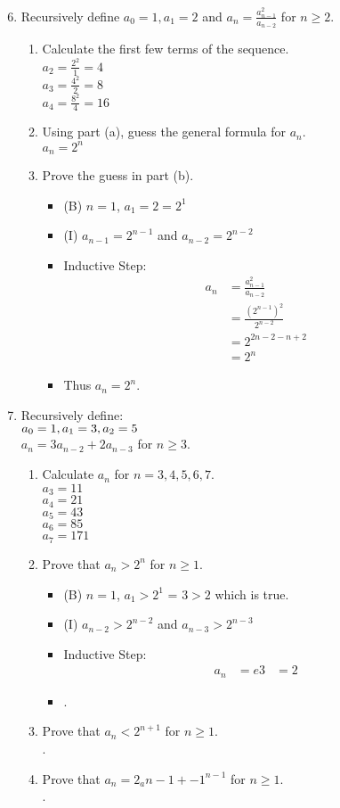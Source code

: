 \documentclass[12pt]{article}
\newcommand{\paren}[1]{\left(#1\right)}
\begin{document}
\begin{enumerate}
\setcounter{enumi}{5}
\item Recursively define $a_0=1,a_1=2$ and $a_n=\frac{a_{n-1}^2}{a_{n-2}}$ for $n\geq2$.
	\begin{enumerate}
	\item Calculate the first few terms of the sequence.\\
	$a_2=\frac{2^2}{1}=4$\\
	$a_3=\frac{4^2}{2}=8$\\
	$a_4=\frac{8^2}{4}=16$
	\item Using part (a), guess the general formula for $a_n$.\\
	$a_n=2^n$
	\item Prove the guess in part (b).
		\begin{itemize}
		\item (B) $n=1$, $a_1=2=2^1$
		\item (I) $a_{n-1}=2^{n-1}$ and $a_{n-2}=2^{n-2}$
		\item Inductive Step:
			\begin{align*}
			a_n &= \frac{a_{n-1}^2}{a_{n-2}}  \\
			&= \frac{\paren{2^{n-1}}^2}{2^{n-2}}\\
			&= 2^{2n-2-n+2}\\
			&= 2^n
			\end{align*}
		\item Thus $a_n=2^n$.
		\end{itemize}
	\end{enumerate}

\setcounter{enumi}{11}
\item Recursively define:\\
	$a_0=1,\\
	a_1=3,\\
	a_2=5$ \\
	$a_n=3a_{n-2}+2a_{n-3}$ for $n\geq3$.
	\begin{enumerate}
	\item Calculate $a_n$ for $n=3,4,5,6,7$.\\
	$a_3=11$\\
	$a_4=21$\\
	$a_5=43$\\
	$a_6=85$\\
	$a_7=171$
	\item Prove that $a_n>2^n$ for $n\geq1$.
		\begin{itemize}
		\item (B) $n=1$, $a_1>2^1$ = $3>2$ which is true.
		\item (I) $a_{n-2}>2^{n-2}$ and $a_{n-3}>2^{n-3}$
		\item Inductive Step:
			\begin{align*}
			a_n &= e
			3 &= 2
			\end{align*}
		\item .
		\end{itemize}
	\item Prove that $a_n<2^{n+1}$ for $n\geq1$.\\
	.
	\item Prove that $a_n=2_a{n-1}+-1^{n-1}$ for $n\geq1$.\\
	.
	\end{enumerate}

\end{enumerate}
\end{document}
